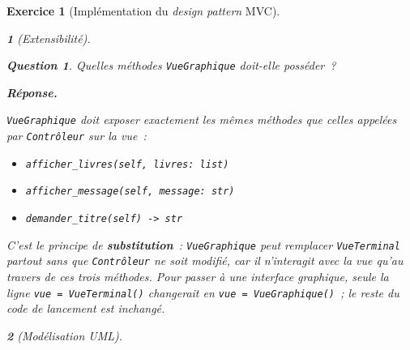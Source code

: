 \documentclass{article}
\theoremstyle{exostyle}
\newtheorem{exo}{Exercice}
\theoremstyle{partiestyle}
\newtheorem{partie}{}[exo]
\theoremstyle{questionstyle}
\newtheorem{questionpartie}{Question}[partie]
\newenvironment{reponse}{%
    \par\smallskip\noindent\textbf{Réponse.}\enspace\ignorespaces
}{%
    \par\smallskip
}
\begin{document}
\begin{exo}[Implémentation du \textit{design pattern} MVC]
\begin{partie}[Extensibilité]
        \begin{questionpartie}
            Quelles méthodes \texttt{VueGraphique} doit-elle posséder~?
        \end{questionpartie}
        \begin{reponse}
            \texttt{VueGraphique} doit exposer exactement les mêmes méthodes que celles appelées par \texttt{Contrôleur} sur la vue~:
            \begin{itemize}
                \item \texttt{afficher\_livres(self, livres: list)}
                \item \texttt{afficher\_message(self, message: str)}
                \item \texttt{demander\_titre(self) -> str}
            \end{itemize}
            C'est le principe de \textbf{substitution}~: \texttt{VueGraphique} peut remplacer \texttt{VueTerminal} partout sans que \texttt{Contrôleur} ne soit modifié, car il n'interagit avec la vue qu'au travers de ces trois méthodes. Pour passer à une interface graphique, seule la ligne \texttt{vue = VueTerminal()} changerait en \texttt{vue = VueGraphique()}~; le reste du code de lancement est inchangé.
        \end{reponse}

    \end{partie}

    \begin{partie}[Modélisation UML]


\end{partie}
\end{exo}
\end{document}
